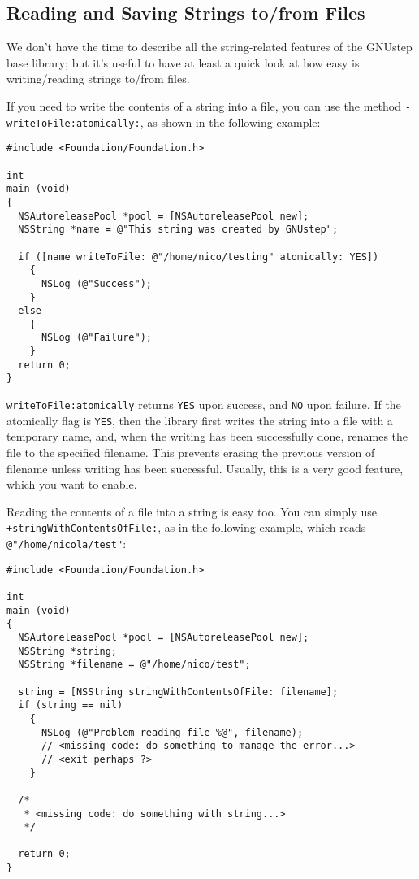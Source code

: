 \documentclass[a4paper]{article}
\begin{document}
\subsection{Reading and Saving Strings to/from Files}
We don't have the time to describe all the string-related features of
the GNUstep base library; but it's useful to have at least a quick
look at how easy is writing/reading strings to/from files.

If you need to write the contents of a string into a file, you can use
the method \texttt{-writeToFile:atomically:}, as shown in the
following example:
\begin{verbatim}
#include <Foundation/Foundation.h>

int
main (void)
{
  NSAutoreleasePool *pool = [NSAutoreleasePool new];
  NSString *name = @"This string was created by GNUstep";

  if ([name writeToFile: @"/home/nico/testing" atomically: YES])
    {
      NSLog (@"Success");
    }
  else 
    {
      NSLog (@"Failure");
    }
  return 0;
}
\end{verbatim}
\texttt{writeToFile:atomically} returns \texttt{YES} upon success, 
and \texttt{NO} upon failure.  If the atomically flag is \texttt{YES}, 
then the library first writes the string into a file with a temporary 
name, and, when the writing has been successfully done, renames the 
file to the specified filename.  This prevents erasing the previous 
version of filename unless writing has been successful.  Usually, this 
is a very good feature, which you want to enable.

Reading the contents of a file into a string is easy too.  You can
simply use \texttt{+stringWithContentsOfFile:}, as in the following
example, which reads \texttt{@"/home/nicola/test"}:
\begin{verbatim}
#include <Foundation/Foundation.h>

int
main (void)
{
  NSAutoreleasePool *pool = [NSAutoreleasePool new];
  NSString *string;
  NSString *filename = @"/home/nico/test";

  string = [NSString stringWithContentsOfFile: filename];
  if (string == nil)
    {
      NSLog (@"Problem reading file %@", filename);
      // <missing code: do something to manage the error...>
      // <exit perhaps ?>
    }

  /*
   * <missing code: do something with string...>
   */

  return 0;
}
\end{verbatim}
\end{document}
